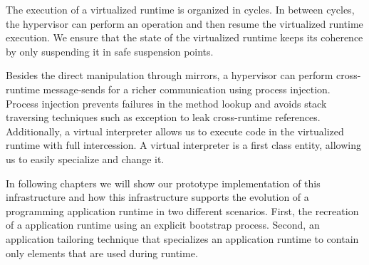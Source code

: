 The execution of a virtualized runtime is organized in cycles. In between cycles, the hypervisor can perform an operation and then resume the virtualized runtime execution. We ensure that the state of the virtualized runtime keeps its coherence by only suspending it in safe suspension points.

Besides the direct manipulation through mirrors, a hypervisor can perform cross-runtime message-sends for a richer communication using process injection. Process injection prevents failures in the method lookup and avoids stack traversing techniques such as exception to leak cross-runtime references. Additionally, a virtual interpreter allows us to execute code in the virtualized runtime with full intercession. A virtual interpreter is a first class entity, allowing us to easily specialize and change it.

In following chapters we will show our prototype implementation of this infrastructure and how this infrastructure supports the evolution of a programming application runtime in two different scenarios. First, the recreation of a application runtime using an explicit bootstrap process. Second, an application tailoring technique that specializes an application runtime to contain only elements that are used during runtime.

